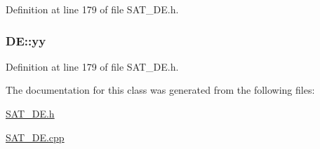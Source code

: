 Definition at line 179 of file S\-A\-T\-\_\-\-D\-E.\-h.

\hypertarget{classDE_ab501e078b2408ca63ee44c1c4d59de86}{
\subsubsection[{yy}]{ D\-E\-::yy\hspace{0.3cm}{\ttfamily [private]}}}\label{classDE_ab501e078b2408ca63ee44c1c4d59de86}


Definition at line 179 of file S\-A\-T\-\_\-\-D\-E.\-h.



The documentation for this class was generated from the following files\-:\begin{DoxyCompactItemize}
\item 
\hyperlink{SAT__DE_8h}{S\-A\-T\-\_\-\-D\-E.\-h}\item 
\hyperlink{SAT__DE_8cpp}{S\-A\-T\-\_\-\-D\-E.\-cpp}\end{DoxyCompactItemize}
